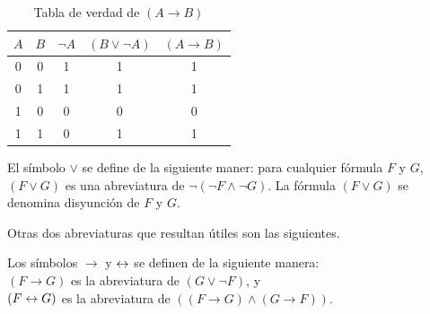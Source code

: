 \documentclass[12pt,a4paper]{book}
\begin{document}
    \begin{table}[htbp]
        \centering
        \caption{Tabla de verdad de $(A\rightarrow B)$}
        \renewcommand{\arraystretch}{1.5}
        \setlength{\tabcolsep}{15pt}
        \begin{tabular}{c | c | c | c | c}
            $A$ & $B$ & $\neg A$ & $(B\vee\neg A)$ & $(A\rightarrow B)$ \\
            \hline
            0 & 0 & 1 & 1 & 1\\
            0 & 1 & 1 & 1 & 1\\
            1 & 0 & 0 & 0 & 0\\
            1 & 1 & 0 & 1 & 1
        \end{tabular}
    \end{table}

    \vspace{1cm}

    \begin{definicion}[Disyunción]
        El símbolo $\vee$ se define de la siguiente maner: para cualquier fórmula $F$ y $G$, $(F\vee G)$ es una abreviatura de
        $\neg(\neg F\wedge \neg G)$. La fórmula $(F\vee G)$ se denomina disyunción de $F$ y $G$.
    \end{definicion}

    Otras dos abreviaturas que resultan útiles son las siguientes.

    \begin{definicion}
        Los símbolos $\rightarrow$ y $\leftrightarrow$ se definen de la siguiente manera:\\
        $(F\rightarrow G)$ es la abreviatura de $(G\vee\neg F)$, y\\
        $(F\leftrightarrow G)$ es la abreviatura de $((F\rightarrow G)\wedge(G\rightarrow F))$.
    \end{definicion}
\end{document}
